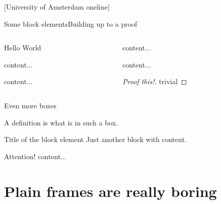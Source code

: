 \documentclass[pdf]{beamer}
\begin{document}
{ %
	[University of Amsterdam oneline]

	\begin{frame}{Some block elements}{Building up to a proof}
		\begin{columns}[t]
			\begin{column}{0.45\textwidth}
				\begin{example}
					Hello World
				\end{example}
				\begin{theorem}
					content...
				\end{theorem}
				\begin{corollary}
					content...
				\end{corollary}
			\end{column}
			\begin{column}{0.45\textwidth}
				\begin{fact}
					content...
				\end{fact}
				\begin{lemma}
					content...
				\end{lemma}
				\begin{proof}[Proof \alert{this!}]
					trivial
				\end{proof}
			\end{column}
		\end{columns}
	\end{frame}
}

\begin{frame}{Even more boxes}

	\begin{definition}[of a definition]
		A \alert{definition} is what is in such a box.
	\end{definition}
	\begin{block}{Title of the block element}
		Just another block with content.
	\end{block}
	\begin{alertblock}{Attention!}
		content...
	\end{alertblock}
	
\end{frame}

\section{Plain frames are really boring}
\end{document}

